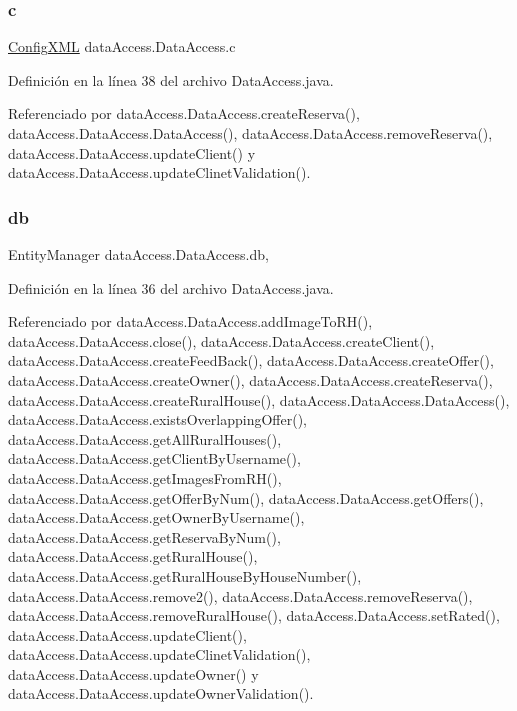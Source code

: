\subsubsection{\texorpdfstring{c}{c}}
{\footnotesize\ttfamily \mbox{\hyperlink{classconfiguration_1_1_config_x_m_l}{Config\+X\+ML}} data\+Access.\+Data\+Access.\+c\hspace{0.3cm}{\ttfamily [package]}}



Definición en la línea 38 del archivo Data\+Access.\+java.



Referenciado por data\+Access.\+Data\+Access.\+create\+Reserva(), data\+Access.\+Data\+Access.\+Data\+Access(), data\+Access.\+Data\+Access.\+remove\+Reserva(), data\+Access.\+Data\+Access.\+update\+Client() y data\+Access.\+Data\+Access.\+update\+Clinet\+Validation().

\mbox{\label{classdata_access_1_1_data_access_a0920d5a9c61bdae39ef950d6e4e187e4}} 
\subsubsection{\texorpdfstring{db}{db}}
{\footnotesize\ttfamily Entity\+Manager data\+Access.\+Data\+Access.\+db\hspace{0.3cm}{\ttfamily [static]}, {\ttfamily [protected]}}



Definición en la línea 36 del archivo Data\+Access.\+java.



Referenciado por data\+Access.\+Data\+Access.\+add\+Image\+To\+R\+H(), data\+Access.\+Data\+Access.\+close(), data\+Access.\+Data\+Access.\+create\+Client(), data\+Access.\+Data\+Access.\+create\+Feed\+Back(), data\+Access.\+Data\+Access.\+create\+Offer(), data\+Access.\+Data\+Access.\+create\+Owner(), data\+Access.\+Data\+Access.\+create\+Reserva(), data\+Access.\+Data\+Access.\+create\+Rural\+House(), data\+Access.\+Data\+Access.\+Data\+Access(), data\+Access.\+Data\+Access.\+exists\+Overlapping\+Offer(), data\+Access.\+Data\+Access.\+get\+All\+Rural\+Houses(), data\+Access.\+Data\+Access.\+get\+Client\+By\+Username(), data\+Access.\+Data\+Access.\+get\+Images\+From\+R\+H(), data\+Access.\+Data\+Access.\+get\+Offer\+By\+Num(), data\+Access.\+Data\+Access.\+get\+Offers(), data\+Access.\+Data\+Access.\+get\+Owner\+By\+Username(), data\+Access.\+Data\+Access.\+get\+Reserva\+By\+Num(), data\+Access.\+Data\+Access.\+get\+Rural\+House(), data\+Access.\+Data\+Access.\+get\+Rural\+House\+By\+House\+Number(), data\+Access.\+Data\+Access.\+remove2(), data\+Access.\+Data\+Access.\+remove\+Reserva(), data\+Access.\+Data\+Access.\+remove\+Rural\+House(), data\+Access.\+Data\+Access.\+set\+Rated(), data\+Access.\+Data\+Access.\+update\+Client(), data\+Access.\+Data\+Access.\+update\+Clinet\+Validation(), data\+Access.\+Data\+Access.\+update\+Owner() y data\+Access.\+Data\+Access.\+update\+Owner\+Validation().

